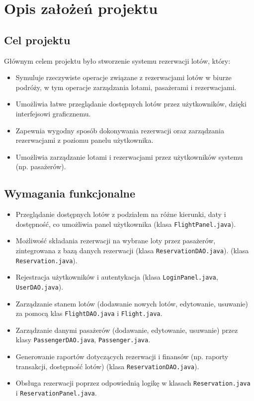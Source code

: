\section{Opis założeń projektu}
\subsection{Cel projektu}
Głównym celem projektu było stworzenie systemu rezerwacji lotów, który:
\begin{itemize}
\item Symuluje rzeczywiste operacje związane z rezerwacjami lotów w biurze podróży, w tym operacje zarządzania lotami, pasażerami i rezerwacjami.
\item Umożliwia łatwe przeglądanie dostępnych lotów przez użytkowników, dzięki interfejsowi graficznemu.
\item Zapewnia wygodny sposób dokonywania rezerwacji oraz zarządzania rezerwacjami z poziomu panelu użytkownika.
\item Umożliwia zarządzanie lotami i rezerwacjami przez użytkowników systemu (np. pasażerów).
\end{itemize}

\subsection{Wymagania funkcjonalne}
\begin{itemize}
\item Przeglądanie dostępnych lotów z podziałem na różne kierunki, daty i dostępność, co umożliwia panel użytkownika (klasa \texttt{FlightPanel.java}).
\item Możliwość składania rezerwacji na wybrane loty przez pasażerów, zintegrowana z bazą danych rezerwacji (klasa \texttt{ReservationDAO.java}).
(klasa \texttt{Reservation.java}).
\item Rejestracja użytkowników i autentykacja (klasa \texttt{LoginPanel.java}, \texttt{UserDAO.java}).
\item Zarządzanie stanem lotów (dodawanie nowych lotów, edytowanie, usuwanie) za pomocą klas \texttt{FlightDAO.java} i \texttt{Flight.java}.
\item Zarządzanie danymi pasażerów (dodawanie, edytowanie, usuwanie) przez klasy \texttt{PassengerDAO.java}, \texttt{Passenger.java}.
\item Generowanie raportów dotyczących rezerwacji i finansów (np. raporty transakcji, dostępność lotów) (klasa \texttt{ReservationDAO.java}).
\item Obsługa rezerwacji poprzez odpowiednią logikę w klasach \texttt{Reservation.java} i \texttt{ReservationPanel.java}.
\end{itemize}

